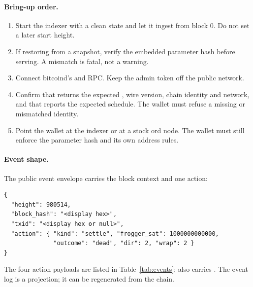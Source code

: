\paragraph{Bring-up order.}
\begin{enumerate}[leftmargin=1.6em,itemsep=0.2em]
  \item Start the indexer with a clean state and let it ingest from block 0.
        Do not set a later start height.
  \item If restoring from a snapshot, verify the embedded parameter hash
        before serving. A mismatch is fatal, not a warning.
  \item Connect bitcoind's  and RPC. Keep the admin
        token off the public network.
  \item Confirm that  returns the expected
        , wire version, chain identity and network, and
        that  reports the expected
        schedule. The wallet must refuse a missing or mismatched identity.
  \item Point the wallet at the indexer or at a stock ord node. The wallet
        must still enforce the parameter hash and its own address rules.
\end{enumerate}

\paragraph{Event shape.}
The public event envelope carries the block context and one action:
\begin{center}
\begin{minipage}{0.92\linewidth}
\begin{lstlisting}[language={},caption={Event envelope.},label={lst:event}]
{
  "height": 980514,
  "block_hash": "<display hex>",
  "txid": "<display hex or null>",
  "action": { "kind": "settle", "frogger_sat": 1000000000000,
              "outcome": "dead", "dir": 2, "wrap": 2 }
}
\end{lstlisting}
\end{minipage}
\end{center}
The four action payloads are listed in Table~\ref{tab:events}; 
also carries . The event log is a projection; it can be regenerated
from the chain.
